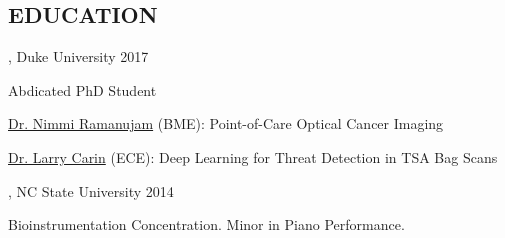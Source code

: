 \documentclass[resmargin]{resume_style_class} %
\newenvironment{outline}
  {\begin{list}{}{\setlength{\leftmargin}{30pt}\setlength\itemsep{-2pt}}}
  {\end{list}}
\newenvironment{outline-cond}
  {\begin{list}{}{
  \setlength{\leftmargin}{30pt}
  \setlength\topsep{-10pt}
  \setlength\itemindent{-30pt}
  }}
  {\end{list}}
\begin{document}
\begin{resume}
\section{EDUCATION}

, Duke University \hfill 2017
\begin{outline}
	\item Abdicated PhD Student
	\item \href{https://bme.duke.edu/faculty/nimmi-ramanujam}{Dr. Nimmi Ramanujam} (BME): Point-of-Care Optical Cancer Imaging
	\item \href{https://scholar.google.com/citations?user=ZhGL6WcAAAAJ&hl=en}{Dr. Larry Carin} (ECE): Deep Learning for Threat Detection in TSA Bag Scans
\end{outline}

, NC State University \hfill 2014
\begin{outline}
	\item Bioinstrumentation Concentration. Minor in Piano Performance.
\end{outline}



\end{resume}
\end{document}
